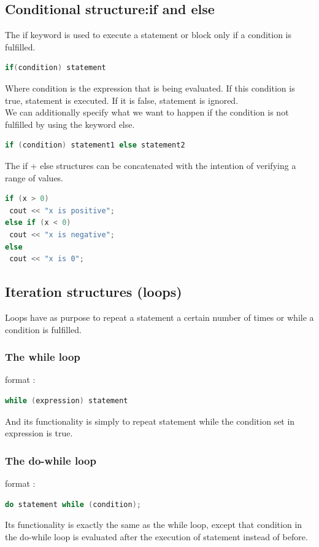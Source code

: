 \documentclass[12pt,oneside]{book}
\begin{document}
\subsection{Conditional structure:if and else}
The if keyword is used to execute a statement or block only if a condition is fulfilled.
	\begin{lstlisting}[language=C++]
    if(condition) statement
\end{lstlisting}
Where condition is the expression that is being evaluated. If this condition is true, statement is executed. If it is false, statement is ignored.\\
We can additionally specify what we want to happen if the condition is not fulfilled by using the keyword else.
	\begin{lstlisting}[language=C++]
    if (condition) statement1 else statement2
\end{lstlisting}
The if + else structures can be concatenated with the intention of verifying a range of values.
	\begin{lstlisting}[language=C++]
if (x > 0) 
 cout << "x is positive";
else if (x < 0) 
 cout << "x is negative";
else
 cout << "x is 0"; 
\end{lstlisting}
\subsection{Iteration structures (loops)}
Loops have as purpose to repeat a statement a certain number of times or while a condition is fulfilled.
\subsubsection{The while loop}
format :
\begin{lstlisting}[language=C++]
    while (expression) statement
\end{lstlisting}
And its functionality is simply to repeat statement while the condition set in expression is true.
\subsubsection{The do-while loop}
format :
\begin{lstlisting}[language=C++]
    do statement while (condition);
\end{lstlisting}
Its functionality is exactly the same as the while loop, except that condition in the do-while loop is evaluated after the execution of statement instead of before.
\end{document}
